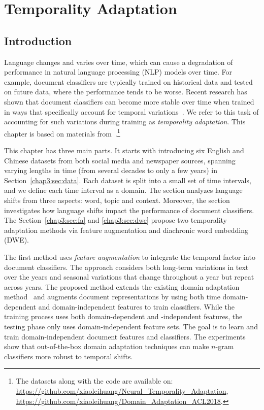 \chapter{Temporality Adaptation}
\label{chp:temporality}

\section{Introduction}
Language changes and varies over time,
which can cause a degradation of performance in
natural language processing (NLP) models over time.
For example, document classifiers are typically trained on historical data and tested on future data, where the performance tends to be worse.
Recent research has shown that document classifiers can become more stable over time when trained in ways that specifically account for temporal variations~\cite{he2018time}.
We refer to this task of accounting for such variations during training as {\em temporality adaptation}.
This chapter is based on materials from~\cite{huang2018examining, huang2019neural}.\footnote{The datasets along with the code are available on: \\\url{https://github.com/xiaoleihuang/Neural_Temporality_Adaptation}, \\\url{https://github.com/xiaoleihuang/Domain_Adaptation_ACL2018}.}

This chapter has three main parts.
It starts with introducing six English and Chinese datasets from both social media and newspaper sources, spanning varying lengths in time (from several decades to only a few years) in Section~\ref{chap3:sec:data}. 
Each dataset is split into a small set of time intervals, and we define each time interval as a domain. 
The section analyzes language shifts from three aspects: word, topic and context. 
Moreover, the section investigates how language shifts impact the performance of document classifiers.
The Section~\ref{chap3:sec:fa} and \ref{chap3:sec:dwe} propose two temporality adaptation methods via feature augmentation and diachronic word embedding (DWE).

The first method uses \textit{feature augmentation} to integrate the temporal factor into document classifiers.
The approach considers both long-term variations in text over the years and seasonal variations that change throughout a year but repeat across years.
The proposed method extends the existing domain adaptation method~\cite{daume2007frustratingly} and augments document representations by using both time domain-dependent and domain-independent features to train classifiers.
While the training process uses both domain-dependent and -independent features, the testing phase only uses domain-independent feature sets.
The goal is to learn and train domain-independent document features and classifiers.
The experiments show that out-of-the-box domain adaptation techniques can make $n$-gram classifiers more robust to temporal shifts.

